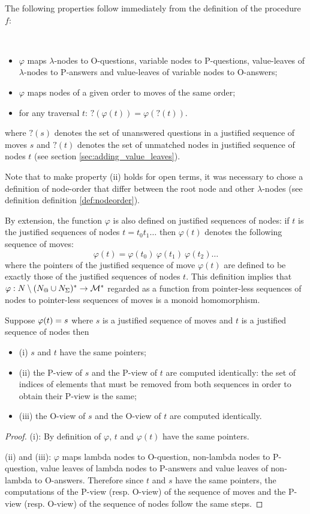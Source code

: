 The following properties follow immediately from the definition of the procedure $f$:
\begin{property} \
\label{proper:phi_conserve_order}
\begin{itemize}
\item[(i)] $\varphi$ maps $\lambda$-nodes to O-questions, variable nodes to
P-questions, value-leaves of $\lambda$-nodes to P-answers and
value-leaves of variable nodes to O-answers;
\item[(ii)] $\varphi$ maps nodes of a given order to moves of the same order;
\item[(iii)] for any traversal $t$: $?(\varphi(t)) = \varphi(?(t))$.
\end{itemize}
where $?(s)$ denotes the set of unanswered questions in a justified sequence of moves $s$ and $?(t)$ denotes the
set of unmatched nodes in justified sequence of nodes $t$ (see section \ref{sec:adding_value_leaves}).
\end{property}
Note that to make property (ii) holds for open terms, it was necessary to chose a definition of node-order that differ
between the root node and other $\lambda$-nodes (see definition definition \ref{def:nodeorder}).


By extension, the function $\varphi$ is also defined on justified
sequences of nodes: if $t$ is the justified sequences of nodes $t =
t_0 t_1 \ldots$ then $\varphi(t)$ denotes the following sequence of
moves:
$$\varphi(t) = \varphi(t_0)\ \varphi(t_1)\  \varphi(t_2) \ldots$$
where the pointers of the justified sequence of move $\varphi(t)$
are defined to be exactly those of the justified sequences of nodes
$t$.
This definition implies that $\varphi : N\setminus (N_@ \cup N_\Sigma)^* \rightarrow \mathcal{M}^*$ regarded as a function
from pointer-less sequences of nodes to pointer-less sequences of moves is a monoid homomorphism.

\begin{property}
\label{proper:phi_pview} Suppose $\varphi(t) = s$ where $s$ is a
justified sequence of moves and $t$ is a justified sequence of nodes
then
\begin{itemize}
\item (i) $s$ and $t$ have the same pointers;
\item (ii) the P-view of $s$ and the P-view of $t$ are computed
identically: the set of indices of elements that must be removed
from both sequences in order to obtain their P-view is the same;
\item (iii) the O-view of $s$ and the O-view of $t$ are computed identically.
\end{itemize}
\end{property}
\begin{proof}
(i): By definition of $\varphi$, $t$ and $\varphi(t)$ have the same
pointers.

(ii) and (iii): $\varphi$ maps lambda nodes to O-question,
non-lambda nodes to P-question, value leaves of lambda nodes to P-answers and
value leaves of non-lambda to O-answers. Therefore since $t$ and $s$ have the
same pointers, the computations of the P-view (resp. O-view) of the
sequence of moves and the P-view (resp. O-view) of the sequence of
nodes follow the same steps.
\end{proof}


